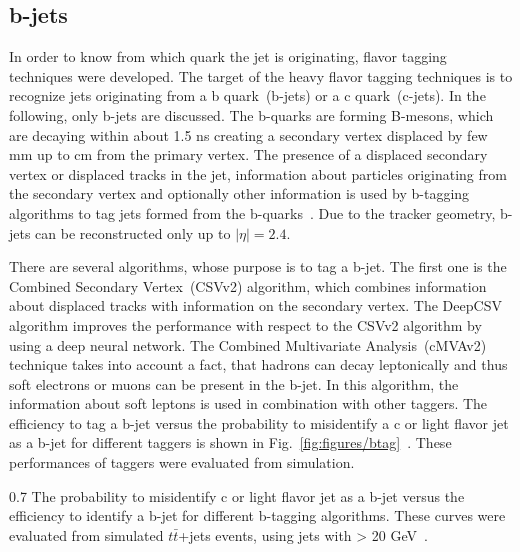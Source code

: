 \subsection{b-jets}

In order to know from which quark the jet is originating, flavor tagging techniques were developed. The target of the heavy flavor tagging techniques is to recognize jets originating from a b quark~(b-jets) or a c quark~(c-jets). In the following, only b-jets are discussed. The b-quarks are forming B-mesons, which are decaying within about 1.5 ns creating a secondary vertex displaced by few mm up to cm from the primary vertex. The presence of a displaced secondary vertex or displaced tracks in the jet, information about particles originating from the secondary vertex and optionally other information is used by b-tagging algorithms to tag jets formed from the b-quarks~\cite{Sirunyan:2017ezt}. Due to the tracker geometry, b-jets can be reconstructed only up to $|\eta|=2.4$.

There are several algorithms, whose purpose is to tag a b-jet. The first one is the Combined Secondary Vertex~(CSVv2) algorithm, which combines information about displaced tracks with information on the secondary vertex. The DeepCSV algorithm improves the performance with respect to the CSVv2 algorithm by using a deep neural network. The Combined Multivariate Analysis~(cMVAv2) technique takes into account a fact, that hadrons can decay leptonically and thus soft electrons or muons can be present in the b-jet. In this algorithm, the information about soft leptons is used in combination with other taggers. The efficiency to tag a b-jet versus the probability to misidentify a c or light flavor jet as a b-jet for different taggers is shown in Fig.~\ref{fig:figures/btag}~\cite{Sirunyan:2017ezt}. These performances of taggers were evaluated from simulation.


                 {0.7}       %
                 { The probability to misidentify c or light flavor jet as a b-jet versus the efficiency to identify a b-jet for different b-tagging algorithms. These curves were evaluated from simulated $t\bar{t}$+jets events, using jets with \pt > 20 GeV~\cite{Sirunyan:2017ezt}. }


